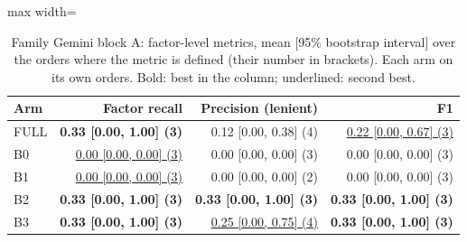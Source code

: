 \begin{table}[htbp]
\centering\footnotesize
\begin{adjustbox}{max width=\textwidth}
\begin{tabular}{@{}lrrr@{}}
\toprule
Arm & Factor recall & Precision (lenient) & F1 \\
\midrule
FULL & \textbf{0.33 [0.00, 1.00] (3)} & 0.12 [0.00, 0.38] (4) & \underline{0.22 [0.00, 0.67] (3)} \\
B0 & \underline{0.00 [0.00, 0.00] (3)} & 0.00 [0.00, 0.00] (3) & 0.00 [0.00, 0.00] (3) \\
B1 & \underline{0.00 [0.00, 0.00] (3)} & 0.00 [0.00, 0.00] (2) & 0.00 [0.00, 0.00] (3) \\
B2 & \textbf{0.33 [0.00, 1.00] (3)} & \textbf{0.33 [0.00, 1.00] (3)} & \textbf{0.33 [0.00, 1.00] (3)} \\
B3 & \textbf{0.33 [0.00, 1.00] (3)} & \underline{0.25 [0.00, 0.75] (4)} & \textbf{0.33 [0.00, 1.00] (3)} \\
\bottomrule
\end{tabular}
\end{adjustbox}
\caption{Family Gemini block A: factor-level metrics, mean [95\% bootstrap interval] over the orders where the metric is defined (their number in brackets). Each arm on its own orders. Bold: best in the column; underlined: second best.}
\label{tab:table1a_gemini}
\end{table}
